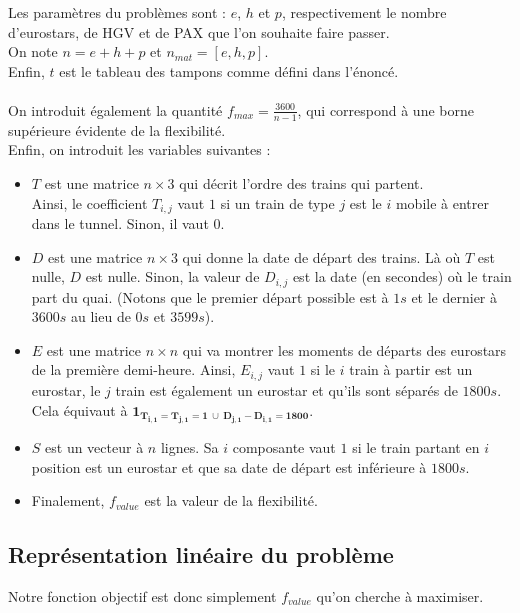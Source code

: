 \documentclass{rapport}
\begin{document}
Les paramètres du problèmes sont : $e$, $h$ et $p$, respectivement le nombre d'eurostars, de HGV et de PAX que l'on souhaite faire passer. \\
On note $n = e + h + p$ et $n_{mat} = [e, h, p]$. \\
Enfin, $t$ est le tableau des tampons comme défini dans l’énoncé. \\
\ \\
On introduit également la quantité $f_{max} = \frac{3600}{n - 1}$, qui correspond à une borne supérieure évidente de la flexibilité.
\ \\
Enfin, on introduit les variables suivantes :
\begin{itemize}
	\item $T$ est une matrice $n \times 3$ qui décrit l'ordre des trains qui partent. \\Ainsi, le coefficient $T_{i,j}$ vaut $1$ si un train de type $j$ est le $i$ mobile à entrer dans le tunnel. Sinon, il vaut 0.
	\item $D$ est une matrice $n \times 3$ qui donne la date de départ des trains. Là où $T$ est nulle, $D$ est nulle. Sinon, la valeur de $D_{i, j}$ est la date (en secondes) où le train part du quai. (Notons que le premier départ possible est à $1s$ et le dernier à $3600s$ au lieu de $0s$ et $3599s$).
	\item $E$ est une matrice $n \times n$ qui va montrer les moments de départs des eurostars de la première demi-heure. Ainsi, $E_{i, j}$ vaut $1$ si le $i$ train à partir est un eurostar, le $j$ train est également un eurostar et qu'ils sont séparés de $1800s$. Cela équivaut à $\mathbf{1_{T_{i,1} = T_{j,1} = 1\ \cup\ D_{j,1} - D_{i,1} = 1800}}$.
	\item $S$ est un vecteur à $n$ lignes. Sa $i$ composante vaut $1$ si le train partant en $i$ position est un eurostar et que sa date de départ est inférieure à $1800s$.
	\item Finalement, $f_{value}$ est la valeur de la flexibilité.
\end{itemize}
\clearpage
\subsection{Représentation linéaire du problème}

Notre fonction objectif est donc simplement $f_{value}$ qu'on cherche à maximiser.
\end{document}

